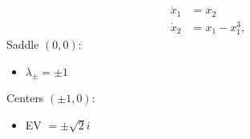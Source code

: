 \documentclass[varwidth, border=5pt]{standalone}
\begin{document}
\[
\begin{aligned}
\dot{x}_1 &= x_2 \\
\dot{x}_2 &= x_1 - x_1^3,
\end{aligned}
\]
Saddle $(0,0)$:
\begin{itemize}
 \item $\lambda_\pm = \pm1$
\end{itemize}
Centers $(\pm1, 0)$:
\begin{itemize}
 \item EV $= \pm\sqrt{2}i$
\end{itemize}
\end{document}
